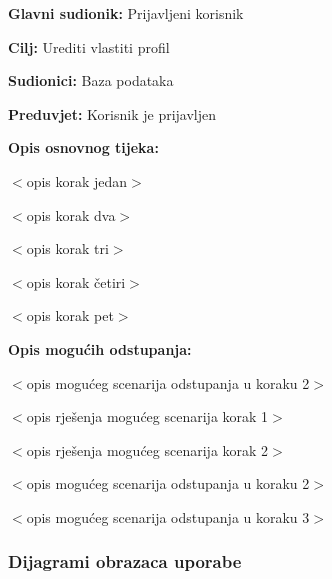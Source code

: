 \noindent {}
\begin{packed_item}

\item \textbf{Glavni sudionik:} Prijavljeni korisnik
\item  \textbf{Cilj:} Urediti vlastiti profil
\item  \textbf{Sudionici:} Baza podataka
\item  \textbf{Preduvjet:} Korisnik je prijavljen
\item  \textbf{Opis osnovnog tijeka:}

\item[] \begin{packed_enum}

    \item $<$opis korak jedan$>$
    \item $<$opis korak dva$>$
    \item $<$opis korak tri$>$
    \item $<$opis korak četiri$>$
    \item $<$opis korak pet$>$

\end{packed_enum}

\item  \textbf{Opis mogućih odstupanja:}

\item[] \begin{packed_item}

    \item[2.a] $<$opis mogućeg scenarija odstupanja u koraku 2$>$
    \item[] \begin{packed_enum}

        \item $<$opis rješenja mogućeg scenarija korak 1$>$
        \item $<$opis rješenja mogućeg scenarija korak 2$>$

    \end{packed_enum}

\item[2.b] $<$opis mogućeg scenarija odstupanja u koraku 2$>$
\item[3.a] $<$opis mogućeg scenarija odstupanja  u koraku 3$>$

\end{packed_item}
\end{packed_item}

\subsubsection{Dijagrami obrazaca uporabe}

